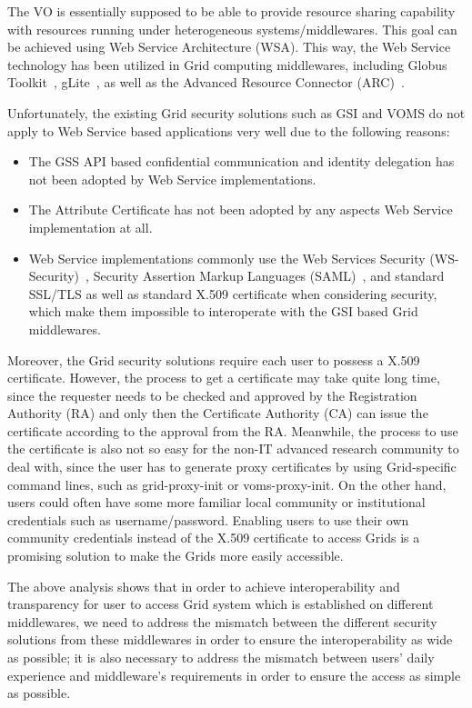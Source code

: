 \documentclass[conference]{IEEEtran}
\begin{document}
The VO is essentially supposed to be able to provide resource sharing capability with resources running under heterogeneous systems/middlewares. This goal can be achieved using Web Service Architecture (WSA). This way, the Web Service technology has been utilized in Grid computing middlewares, including Globus Toolkit~\cite{GTlink}, gLite~\cite{gLitelink}, as well as the Advanced Resource Connector (ARC)~\cite{ARClink}.

Unfortunately, the existing Grid security solutions such as GSI and VOMS do not apply to Web Service based applications very well due to the following reasons:
\begin{itemize}
\item The GSS API based confidential communication and identity delegation has not been adopted by Web Service implementations.
\item The Attribute Certificate has not been adopted by any aspects Web Service implementation at all.
\item Web Service implementations commonly use the Web Services Security (WS-Security)~\cite{WSSeclink}, Security Assertion Markup Languages (SAML)~\cite{SAMLlink}, and standard SSL/TLS as well as standard X.509 certificate when considering security, which make them impossible to interoperate with the GSI based Grid middlewares.
\end{itemize}

Moreover, the Grid security solutions require each user to possess a X.509 certificate. However, the process to get a certificate may take quite long time, since the requester needs to be checked and approved by the Registration Authority (RA) and only then the Certificate Authority (CA) can issue the certificate according to the approval from the RA. Meanwhile, the process to use the certificate is also not so easy for the non-IT advanced research community to deal with, since the user has to generate proxy certificates by using Grid-specific command lines, such as grid-proxy-init or voms-proxy-init. On the other hand, users could often have some more familiar local community or institutional credentials such as username/password. Enabling users to use their own community credentials instead of the X.509 certificate to access Grids is a promising solution to make the Grids more easily accessible.

The above analysis shows that in order to achieve interoperability and transparency for user to access Grid system which is established on different middlewares, we need to address the mismatch between the different security solutions from these middlewares in order to ensure the interoperability as wide as possible; it is also necessary to address the mismatch between users' daily experience and middleware's requirements in order to ensure the access as simple as possible.
\end{document}
